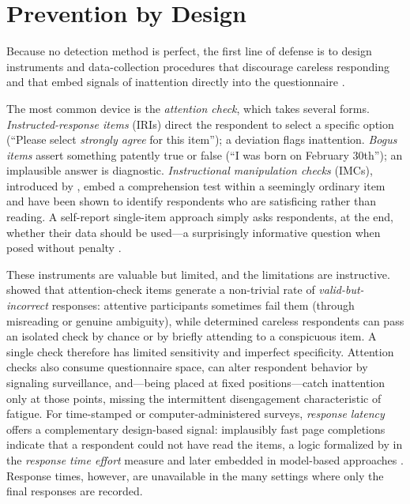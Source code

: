 \documentclass[doc,11pt,donotrepeattitle]{apa7}
\begin{document}
\section{Prevention by Design}

Because no detection method is perfect, the first line of defense is to design
instruments and data-collection procedures that discourage careless responding
and that embed signals of inattention directly into the questionnaire
\parencite{ward2023dealing, desimone2015best}.

The most common device is the \emph{attention check}, which takes several forms.
\emph{Instructed-response items} (IRIs) direct the respondent to select a
specific option (``Please select \emph{strongly agree} for this item''); a
deviation flags inattention. \emph{Bogus items} assert something patently true
or false (``I was born on February 30th''); an implausible answer is
diagnostic. \emph{Instructional manipulation checks} (IMCs), introduced by
\textcite{oppenheimer2009instructional}, embed a comprehension test within a
seemingly ordinary item and have been shown to identify respondents who are
satisficing rather than reading. A self-report single-item approach simply asks
respondents, at the end, whether their data should be used---a surprisingly
informative question when posed without penalty \parencite{meade2012identifying}.

These instruments are valuable but limited, and the limitations are
instructive. \textcite{curran2019paid} showed that attention-check items
generate a non-trivial rate of \emph{valid-but-incorrect} responses: attentive
participants sometimes fail them (through misreading or genuine ambiguity),
while determined careless respondents can pass an isolated check by chance or by
briefly attending to a conspicuous item. A single check therefore has limited
sensitivity and imperfect specificity. Attention checks also consume
questionnaire space, can alter respondent behavior by signaling surveillance,
and---being placed at fixed positions---catch inattention only at those points,
missing the intermittent disengagement characteristic of fatigue. For
time-stamped or computer-administered surveys, \emph{response latency} offers a
complementary design-based signal: implausibly fast page completions indicate
that a respondent could not have read the items, a logic formalized by
\textcite{wise2005response} in the \emph{response time effort} measure and later
embedded in model-based approaches \parencite{ulitzsch2022response}. Response
times, however, are unavailable in the many settings where only the final
responses are recorded.
\end{document}
